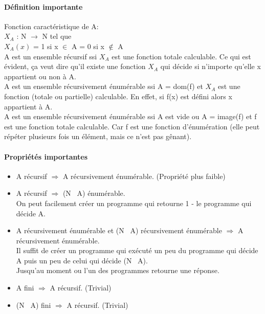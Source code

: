 \documentclass[11pt,a4paper]{article}
\begin{document}
\paragraph{Définition importante}
\label{par:d_finition_importante}
Fonction caractéristique de A: \\
$X_A$ : N $\rightarrow$ N tel que \\
$X_A(x)$ = 1 si x $\in$ A
       = 0 si x $\notin$ A %
\\
A est un ensemble récursif ssi $X_A$ est une fonction totale calculable. Ce qui
est évident, ça veut dire qu'il existe une fonction $X_A$ qui décide si n'importe
qu'elle x appartient ou non à A.\\
A est un ensemble récursivement énumérable ssi A = dom(f) et $X_A$ est une 
fonction (totale ou partielle) calculable. En effet, si f(x) est défini alors
x appartient à A.\\
A est un ensemble récursivement énumérable ssi A est vide ou A = image(f) et f
est une fonction totale calculable. Car f est une fonction d'énumération (elle
peut répéter plusieurs fois un élément, mais ce n'est pas gênant).\\

\paragraph{Propriétés importantes}
\label{par:propri_t_s_importantes}
\begin{itemize}
	\item A récursif $\Rightarrow$ A récursivement énumérable. (Propriété plus
		faible)
	\item A récursif $\Rightarrow$ (N \ A) énumérable.\\ On peut facilement créer
		un programme qui retourne 1 - le programme qui décide A.
	\item A récursivement énumérable et (N \ A) récursivement énumérable 
		$\Rightarrow$ A récursivement énumérable.\\ Il suffit de créer un programme
		qui exécuté un peu du programme qui décide A puis un peu de celui qui
		décide (N \ A). \\Jusqu'au moment ou l'un des programmes retourne une
		réponse.
	\item A fini $\Rightarrow$ A récursif. (Trivial)
	\item (N \ A) fini $\Rightarrow$ A récursif. (Trivial)
\end{itemize}










\end{document}
